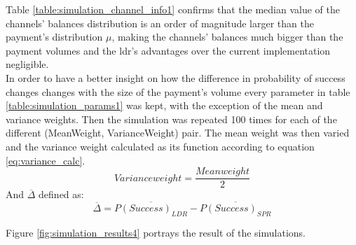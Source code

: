 \begin{table}[H]
\centering
{}
\caption{Median channel balance and payment volume distribution parameters}
\label{table:simulation_channel_info1}
\end{table}

Table \ref{table:simulation_channel_info1} confirms that the median value of the channels' balances distribution is an order of magnitude larger than the payment's distribution $\mu$, making the channels' balances much bigger than the payment volumes and the \acrshort{ldr}'s advantages over the current implementation negligible. \\

In order to have a better insight on how the difference in probability of success changes changes with the size of the payment's volume every parameter in table \ref{table:simulation_params1} was kept, with the exception of the mean and variance weights. Then the simulation was repeated 100 times for each of the different (MeanWeight, VarianceWeight) pair.
The mean weight was then varied and the variance weight calculated as its function according to equation \ref{eq:variance_calc}.
\begin{equation}
    Variance weight = \frac{Mean weight}{2}
    \label{eq:variance_calc}
\end{equation}
And $\overline{\Delta}$ defined as:
\begin{equation}
    \overline{\Delta} = \overline{P(Success)_{LDR}} - \overline{P(Success)_{SPR}}
\end{equation}

Figure \ref{fig:simulation_results4} portrays the result of the simulations.

